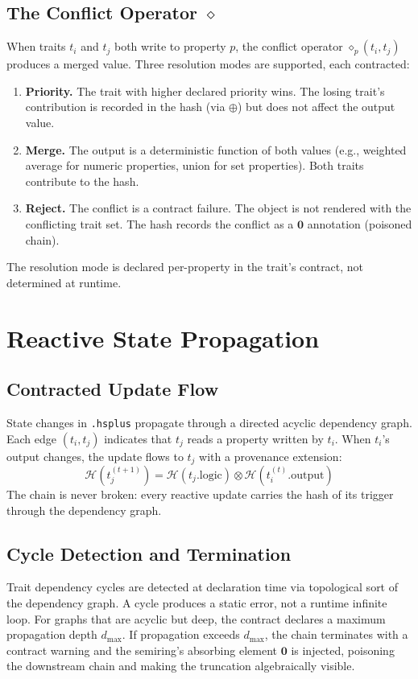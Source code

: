 \documentclass[sigconf,nonacm]{acmart}
\newcommand{\hsplus}{\texttt{.hsplus}}
\newcommand{\hashfn}{\mathcal{H}}
\newcommand{\tropplus}{\oplus}
\newcommand{\tropmult}{\otimes}
\newcommand{\conflictop}{\diamond}
\begin{document}
\subsection{The Conflict Operator $\conflictop$}
\label{sec:conflict}

When traits $t_i$ and $t_j$ both write to property $p$, the
conflict operator $\conflictop_p(t_i, t_j)$ produces a
merged value. Three resolution modes are supported, each
contracted:

\begin{enumerate}
  \item \textbf{Priority.} The trait with higher declared
    priority wins. The losing trait's contribution is
    recorded in the hash (via $\tropplus$) but does not
    affect the output value.
  \item \textbf{Merge.} The output is a deterministic
    function of both values (e.g., weighted average for
    numeric properties, union for set properties). Both
    traits contribute to the hash.
  \item \textbf{Reject.} The conflict is a contract
    failure. The object is not rendered with the
    conflicting trait set. The hash records the conflict
    as a $\mathbf{0}$ annotation (poisoned chain).
\end{enumerate}

The resolution mode is declared per-property in the trait's
contract, not determined at runtime.

\section{Reactive State Propagation}
\label{sec:reactive}

\subsection{Contracted Update Flow}
State changes in \hsplus{} propagate through a directed
acyclic dependency graph. Each edge $(t_i, t_j)$ indicates
that $t_j$ reads a property written by $t_i$. When $t_i$'s
output changes, the update flows to $t_j$ with a provenance
extension:
$$\hashfn(t_j^{(t+1)}) = \hashfn(t_j.\text{logic})
  \tropmult \hashfn(t_i^{(t)}.\text{output})$$
The chain is never broken: every reactive update carries the
hash of its trigger through the dependency graph.

\subsection{Cycle Detection and Termination}
Trait dependency cycles are detected at declaration time via
topological sort of the dependency graph. A cycle produces a
static error, not a runtime infinite loop. For graphs that
are acyclic but deep, the contract declares a maximum
propagation depth $d_{\max}$. If propagation exceeds
$d_{\max}$, the chain terminates with a contract warning
and the semiring's absorbing element $\mathbf{0}$ is
injected, poisoning the downstream chain and making the
truncation algebraically visible.
\end{document}
